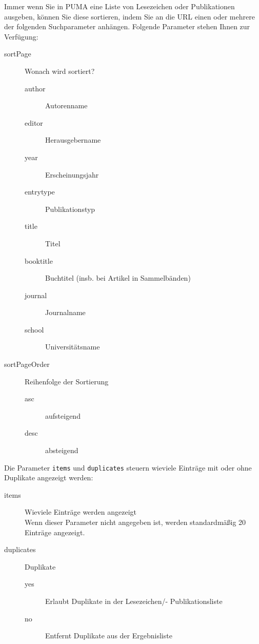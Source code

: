 Immer wenn Sie in PUMA eine Liste von Lesezeichen oder Publikationen ausgeben, können Sie diese sortieren, indem Sie an die URL einen oder mehrere der folgenden Suchparameter anhängen. Folgende Parameter stehen Ihnen zur Verfügung:
\begin{description}
    \item [sortPage] Wonach wird sortiert?
    \begin{description}
        \item [author] Autorenname
        \item [editor] Herausgebername
        \item [year] Erscheinungsjahr
        \item [entrytype] Publikationstyp
        \item [title] Titel
        \item [booktitle] Buchtitel (insb. bei Artikel in Sammelbänden)
        \item [journal] Journalname
        \item [school] Universitätsname 
    \end{description}
    \item [sortPageOrder] Reihenfolge der Sortierung
    \begin{description}
        \item [asc] aufsteigend
        \item [desc] absteigend 
    \end{description}
\end{description}

Die Parameter \texttt{items} und \texttt{duplicates} steuern wieviele Einträge mit oder ohne Duplikate angezeigt werden:

\begin{description}		
    \item [items] Wieviele Einträge werden angezeigt\hfill \\
		 Wenn dieser Parameter nicht angegeben ist, werden standardmäßig 20 Einträge angezeigt.
    \item [duplicates] Duplikate
    \begin{description}
        \item [yes] Erlaubt Duplikate in der Lesezeichen/- Publikationsliste
        \item [no] Entfernt Duplikate aus der Ergebnisliste
    \end{description}
\end{description}



